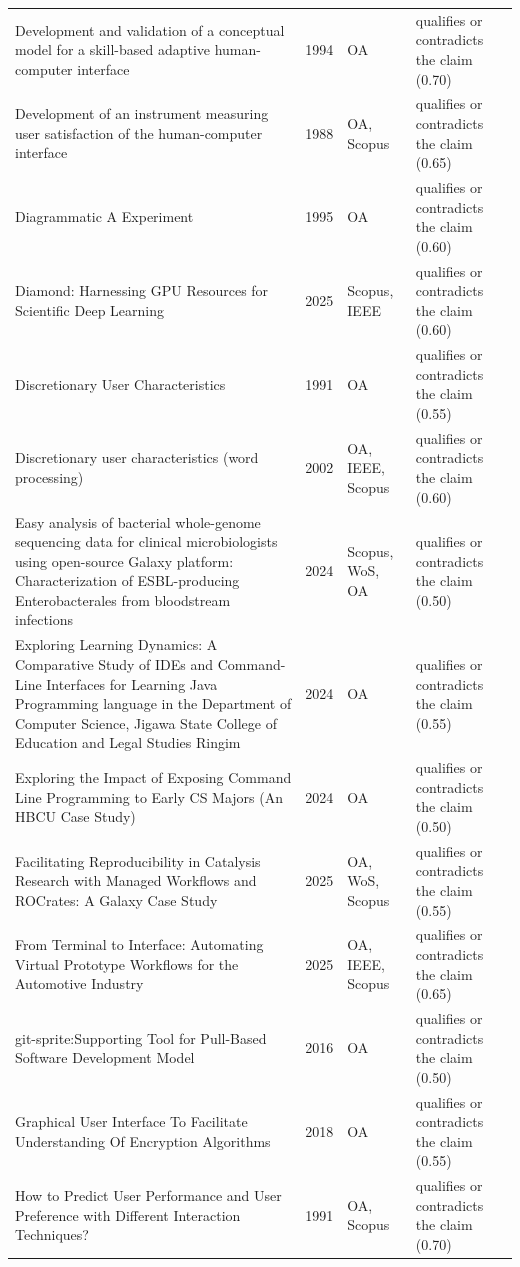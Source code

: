 \begin{longtable}{@{}%
  >{\raggedright\arraybackslash}p{}c%
  >{\raggedright\arraybackslash}p{}%
  >{\raggedright\arraybackslash}p{}@{}}
Development and validation of a conceptual model for a skill-based adaptive human-computer interface & 1994 & OA & qualifies or contradicts the claim (0.70) \\
Development of an instrument measuring user satisfaction of the human-computer interface & 1988 & OA, Scopus & qualifies or contradicts the claim (0.65) \\
Diagrammatic A Experiment & 1995 & OA & qualifies or contradicts the claim (0.60) \\
Diamond: Harnessing GPU Resources for Scientific Deep Learning & 2025 & Scopus, IEEE & qualifies or contradicts the claim (0.60) \\
Discretionary User Characteristics & 1991 & OA & qualifies or contradicts the claim (0.55) \\
Discretionary user characteristics (word processing) & 2002 & OA, IEEE, Scopus & qualifies or contradicts the claim (0.60) \\
Easy analysis of bacterial whole-genome sequencing data for clinical microbiologists using open-source Galaxy platform: Characterization of ESBL-producing Enterobacterales from bloodstream infections & 2024 & Scopus, WoS, OA & qualifies or contradicts the claim (0.50) \\
Exploring Learning Dynamics: A Comparative Study of IDEs and Command-Line Interfaces for Learning Java Programming language in the Department of Computer Science, Jigawa State College of Education and Legal Studies Ringim & 2024 & OA & qualifies or contradicts the claim (0.55) \\
Exploring the Impact of Exposing Command Line Programming to Early CS Majors (An HBCU Case Study) & 2024 & OA & qualifies or contradicts the claim (0.50) \\
Facilitating Reproducibility in Catalysis Research with Managed Workflows and ROCrates: A Galaxy Case Study & 2025 & OA, WoS, Scopus & qualifies or contradicts the claim (0.55) \\
From Terminal to Interface: Automating Virtual Prototype Workflows for the Automotive Industry & 2025 & OA, IEEE, Scopus & qualifies or contradicts the claim (0.65) \\
git-sprite:Supporting Tool for Pull-Based Software Development Model & 2016 & OA & qualifies or contradicts the claim (0.50) \\
Graphical User Interface To Facilitate Understanding Of Encryption Algorithms & 2018 & OA & qualifies or contradicts the claim (0.55) \\
How to Predict User Performance and User Preference with Different Interaction Techniques? & 1991 & OA, Scopus & qualifies or contradicts the claim (0.70) \\

\end{longtable}
